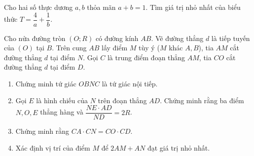 \begin{ex}%
Cho hai số thực dương $a,b$ thỏa mãn $a+b=1$. Tìm giá trị nhỏ nhất của biểu thức $T=\dfrac{4}{a}+\dfrac{1}{b}$.
\end{ex}
\begin{ex}%
Cho nửa đường tròn $(O;R)$ có đường kính $AB$. Vẽ đường thẳng $d$ là tiếp tuyến của $(O)$ tại $B$. Trên cung $AB$ lấy điểm $M$ tùy ý ($M$ khác $A,B$), tia $AM$ cắt đường thẳng $d$ tại điểm $N$. Gọi $C$ là trung điểm đoạn thẳng $AM$, tia $CO$ cắt đường thẳng $d$ tại điểm $D$.
\begin{enumerate}
\item Chứng minh tứ giác $OBNC$ là tứ giác nội tiếp.
\item Gọi $E$ là hình chiếu của $N$ trên đoạn thẳng $AD$. Chứng minh rằng ba điểm $N,O,E$ thẳng hàng và $\dfrac{NE\cdot AD}{ND}=2R$.
\item Chứng minh rằng $CA\cdot CN=CO\cdot CD$.
\item Xác định vị trí của điểm $M$ để $2AM+AN$ đạt giá trị nhỏ nhất.
\end{enumerate}
\end{ex}
